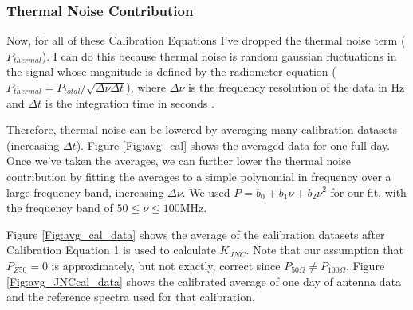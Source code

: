 \subsubsection{Thermal Noise Contribution}

Now, for all of these Calibration Equations I've dropped the thermal noise term ($P_{thermal}$). I can do this because thermal noise is random gaussian fluctuations in the signal whose magnitude is defined by the radiometer equation ($P_{thermal} = P_{total}/\sqrt{\Delta \nu \Delta t}$), where $\Delta \nu$ is the frequency resolution of the data in Hz and $\Delta t$ is the integration time in seconds \cite{stutzman1981}. 

Therefore, thermal noise can be lowered by averaging many calibration datasets (increasing $\Delta t$). Figure \ref{Fig:avg_cal} shows the averaged data for one full day. Once we've taken the averages, we can further lower the thermal noise contribution by fitting the averages to a simple polynomial in frequency over a large frequency band, increasing $\Delta \nu$. We used $P = b_0 + b_1 \nu +b_2 \nu^2$ for our fit, with the frequency band of $50 \leq \nu \leq 100$MHz. 

Figure \ref{Fig:avg_cal_data} shows the average of the calibration datasets after Calibration Equation 1 is used to calculate $K_{JNC}$. Note that our assumption that $P_{Z50}=0$ is approximately, but not exactly, correct since $P_{50 \Omega} \neq P_{100 \Omega}$. Figure \ref{Fig:avg_JNCcal_data} shows the calibrated average of one day of antenna data and the reference spectra used for that calibration. 

